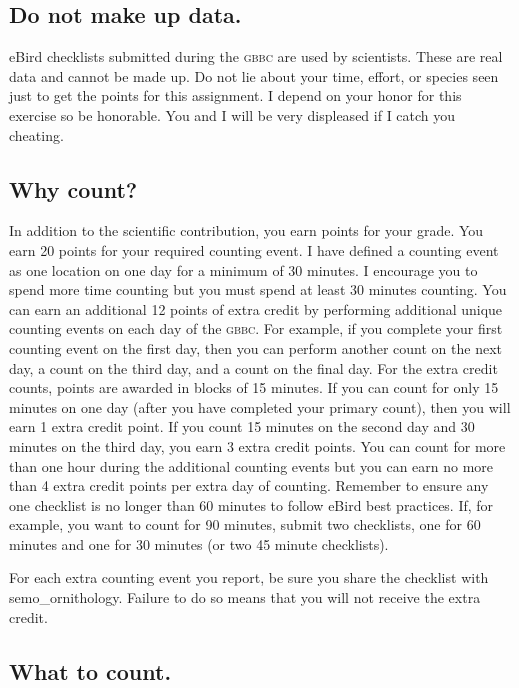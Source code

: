 \documentclass[11pt]{article}
\begin{document}
\subsection*{Do not make up data.}

eBird checklists submitted during the \textsc{gbbc} are used by scientists. These are real data and cannot be made up.  Do not lie about your time, effort, or species seen just to get the points for this assignment. I depend on your honor for this exercise so be honorable. You and I will be very displeased if I catch you cheating.

\subsection*{Why count?}
In addition to the scientific contribution, you earn points for your grade. You earn 20 points for your required counting event. I have defined a counting event as one location on one day for a minimum of 30 minutes. I encourage you to spend more time counting but you must spend at least 30 minutes counting.  You can earn an additional 12 points of extra credit by performing additional unique counting events on each day of the \textsc{gbbc}. For example, if you complete your first counting event on the first day, then you can perform another count on the next day, a count on the third day, and a count on the final day.  For the extra credit counts, points are awarded in blocks of 15 minutes. If you can count for only 15 minutes on one day (after you have completed your primary count), then you will earn 1 extra credit point. If you count 15 minutes on the second day and 30 minutes on the third day, you earn 3 extra credit points.  You can count for more than one hour during the additional counting events but you can earn no more than 4 extra credit points per extra day of counting.  Remember to ensure any one checklist is no longer than 60 minutes to follow eBird best practices. If, for example, you want to count for 90 minutes, submit two checklists, one for 60 minutes and one for 30 minutes (or two 45 minute checklists).

For each extra counting event you report, be sure you share the checklist with semo\_ornithology. Failure to do so means that you will not receive the extra credit.

\subsection*{What to count.}
\end{document}
